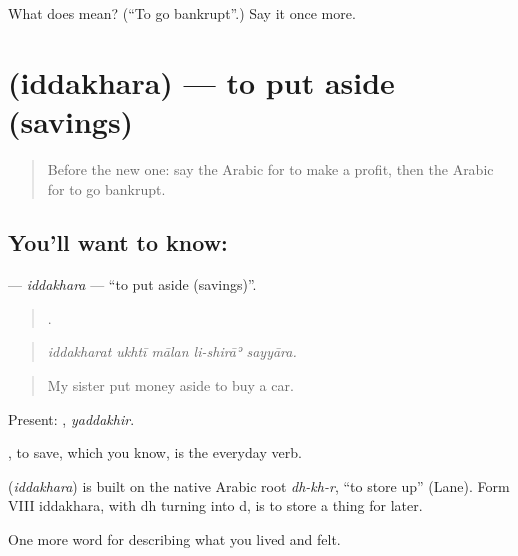 \begin{tcolorbox}[breakable,colback=teal!4,colframe=teal!35!black,title={Before you move on}]
What does  mean? (\textquotedblleft{}To go bankrupt\textquotedblright{}.) Say it once more.
\end{tcolorbox}
\section[\texorpdfstring{\ar{ادخر} (iddakhara)}{ادخر (iddakhara)}]{ (iddakhara) — to put aside (savings)}

\label{lesson:AR-C527-iddakhara}



\begin{quote}
Before the new one: say the Arabic for to make a profit, then the Arabic for to go bankrupt.
\end{quote}

\subsection*{You'll want to know: }
\textbf{} — \emph{iddakhara} — \textquotedblleft{}to put aside (savings)\textquotedblright{}.

\begin{quote}
    .
\end{quote}

\begin{quote}
\emph{iddakharat ukhtī mālan li-shirāʾ sayyāra.}
\end{quote}

\begin{quote}
My sister put money aside to buy a car.
\end{quote}

Present: , \emph{yaddakhir}.

, to save, which you know, is the everyday verb.

\begin{cousinweb}
\textbf{} (\emph{iddakhara}) is built on the native Arabic root \emph{dh-kh-r}, \textquotedblleft{}to store up\textquotedblright{} (Lane). Form VIII iddakhara, with dh turning into d, is to store a thing for later.
\end{cousinweb}

\begin{grammarlens}[title={What you've built}]
One more word for describing what you lived and felt.
\end{grammarlens}

